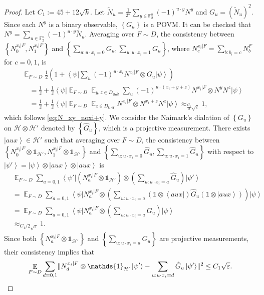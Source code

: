 \documentclass[11pt]{article}
\theoremstyle{plain}
\theoremstyle{definition}
\newcommand {\set} [1] {\ensuremath{ \left\lbrace #1 \right\rbrace }}
\DeclarePairedDelimiter{\norm}{\lVert}{\rVert}
\newcommand {\bra} [1] {\ensuremath{ \left\langle #1 \right| }}
\newcommand {\ket} [1] {\ensuremath{ \left| #1 \right\rangle }}
\DeclareMathOperator*{\bigE}{\mathbb{E}}
\newcommand {\id} {\ensuremath{\mathds{1}}}
\newcommand{\ep} {\ensuremath{\varepsilon}}
\newcommand{\x}{\otimes}
\newcommand{\calH}{\mathcal{H}}
\newcommand{\appd}[1]{\approx_{#1}}
\newcommand{\1}{\mathbb{1}} %
\newcommand{\bF}{\mathbb{F}}
\newcommand{\tN}{\tilde{N}}
\newcommand{\Unif}{\mathsf{Unif}}
\begin{document}
\begin{proof}
Let $C_1 := 45 + 12\sqrt{k}$.
 Let $\tN_u = \frac{1}{2^{n}}\sum_{y \in \bF_2^{n}} (-1)^{u\cdot y} N^{y}$ and $G_u = (\tN_u)^2$. Since each $N^{y}$ is a binary observable, $\set{G_u}$ is a POVM.
	 It can be checked that $N^{y} = \sum_{u\in \bF_2^n} (-1)^{u \cdot y} \tN_u$.
	 Averaging over $F \sim D$, the consistency between $\set{ N^{x_i | F}_0, N^{x_i | F}_1}$ and $\set{ \sum_{u:u\cdot x_i = 0} G_u, \sum_{u:u\cdot x_i = 1} G_u}$,
     where $N^{x_i | F}_c = \sum_{b: b_i = c} N^F_b$ for $c = 0,1$,
	 is 
	 \begin{align*}
	 	&\bigE_{F \sim D} \frac{1}{2}(1 + \bra{\psi} \sum_u (-1)^{u \cdot x_i}N^{x_i | F} \x G_u \ket{\psi}) \\
		&\quad =\frac{1}{2} + \frac{1}{2} \bra{\psi} \bigE_{F \sim D} \bigE_{y,z \in D_{\Unif}} \sum_u (-1)^{u \cdot (x_i+y+z)} N^{x_i | F} \x N^{y} N^{z} \ket{\psi} \\
		&\quad =  \frac{1}{2} + \frac{1}{2} \bra{\psi} \bigE_{F \sim D} \bigE_{z\in D_{\Unif}}N^{x_i | F }\x N^{x_i + z} N^{z}  \ket{\psi} 
		\approx_{\frac{C_1}{2} \sqrt{\ep}} 1,
	 \end{align*}
	 which follows \cref{eq:N_xy_noxi+y}.
We consider the Naimark's dialation of $\set{ G_u }$ on $\calH \x \calH'$ denoted by $\set{ \hat{G}_u }$, which is a projective measurement.
There exists $\ket{aux} \in \calH'$ such that 
averaging over $F \sim D$, the consistency between $\set{ N^{x_i | F}_0 \x \id_{\calH'}, N^{x_i | F}_1\x \id_{\calH'}}$ and $\set{ \sum_{u:u\cdot x_i = 0} \hat{G}_u, \sum_{u:u\cdot x_i = 1} \hat{G}_u}$ with respect to $\ket{\psi'} = \ket{\psi} \x \ket{aux} \x \ket{aux}$ is 
\begin{align*}
	&\bigE_{F \sim D} \sum_{a =0,1} \bra{\psi'} (N^{x_i | F}_a \x \id_{\calH'}) \x  (\sum_{u: u\cdot x_i = a} \hat{G}_u) \ket{\psi'} \\
	&=  \bigE_{F \sim D} \sum_{a =0,1} \bra{\psi} N^{x_i | F}_a \x \left(\sum_{u: u\cdot x_i = a} (\id \x \bra{aux}) \hat{G}_u (\id \x \ket{aux} ) \right) \ket{\psi} \\
	&=   \bigE_{F \sim D} \sum_{a =0,1} \bra{\psi} N^{x_i | F}_a \x\left(\sum_{u: u\cdot x_i = a} G_u \right) \ket{\psi} \\
	&\appd{C_1/2\sqrt{\ep}} 1.
\end{align*}
Since both $\set{ N^{x_i | F}_a \x \id_{\calH'} }$ and $\set{ \sum_{u: u\cdot x_i = a} \hat{G}_u }$ are projective measurements, their consistency implies that 
\begin{align*}
	\bigE_{F \sim D} \sum_{d = 0, 1} \norm{ N^{x_i | F}_d \x \id_{\calH'} \ket{\psi'} - \sum_{u: u \cdot x_i = d} \hat{G}_u \ket{\psi'}}^2 \leq C_1 \sqrt{\ep}.
\end{align*}


\end{proof}
\end{document}
